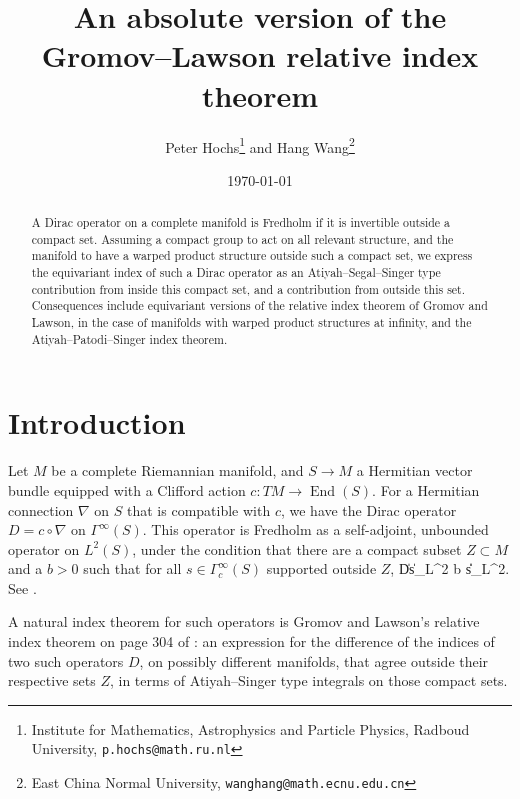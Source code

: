 \documentclass[11pt]{article}
\theoremstyle{plain}
\theoremstyle{definition}
\theoremstyle{remark}
\numberwithin{equation}{section}
\DeclareMathOperator{\End}{End}
\begin{document}
\newenvironment{proofof}[1]
{\noindent \emph{Proof of #1.}}{\hfill $\square$}

\title{An absolute version of the Gromov--Lawson relative index theorem}

\author{Peter Hochs\footnote{Institute for Mathematics, Astrophysics and Particle Physics, Radboud University, \texttt{p.hochs@math.ru.nl}}
{}
and Hang Wang\footnote{East China Normal University, \texttt{wanghang@math.ecnu.edu.cn}}}

\date{\today}

\maketitle

\begin{abstract}
A Dirac operator on a complete manifold is Fredholm if it is invertible outside a compact set. Assuming a compact group to act on all relevant structure, and the manifold to have a warped product structure outside such a compact set, 
we express the equivariant index of such a Dirac operator as an Atiyah--Segal--Singer type contribution from inside this compact set, and a contribution from outside this set. Consequences include equivariant versions of the relative index theorem of Gromov and Lawson, in the case of manifolds with warped product structures at infinity, and the Atiyah--Patodi--Singer index theorem.
\end{abstract}

\tableofcontents

\section{Introduction}

Let $M$ be a complete Riemannian manifold, and $S \to M$ a Hermitian vector bundle equipped with a Clifford action $c \colon TM \to \End(S)$. For a Hermitian connection $\nabla$ on $S$ that is compatible with $c$, we have the Dirac operator $D = c \circ \nabla$ on $\Gamma^{\infty}(S)$. This operator is Fredholm as a self-adjoint, unbounded operator on $L^2(S)$, under the condition that there are a compact subset $Z \subset M$ and a $b>0$ such that for all $s \in \Gamma_c^{\infty}(S)$ supported outside $Z$,
\|Ds\|_{L^2} \geq b \|s\|_{L^2}.
\eeq
See  \cite{Anghel93b, Gromov83}.

A natural index theorem for such operators is Gromov and Lawson's relative index theorem on  page 304 of \cite{Gromov83}: an expression for the difference of the indices of two such operators $D$, on possibly different manifolds, that agree outside their respective sets $Z$, in terms of Atiyah--Singer type integrals on those compact sets.
\end{document}
